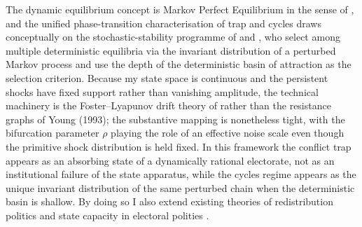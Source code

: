 \documentclass[11pt,twoside]{extarticle}
\begin{document}
The dynamic equilibrium concept is Markov Perfect Equilibrium in the sense of \citet{maskinMarkovPerfectEquilibrium2001}, and the unified phase-transition characterisation of trap and cycles draws conceptually on the stochastic-stability programme of \citet{youngEvolutionConventions1993,youngIndividualStrategySocial2020} and \citet{kandoriLearningMutationLong1993a}, who select among multiple deterministic equilibria via the invariant distribution of a perturbed Markov process and use the depth of the deterministic basin of attraction as the selection criterion. Because my state space is continuous and the persistent shocks have fixed support rather than vanishing amplitude, the technical machinery is the Foster--Lyapunov drift theory of \citet{meynMarkovChainsStochastic2012} rather than the resistance graphs of Young (1993); the substantive mapping is nonetheless tight, with the bifurcation parameter $\rho$ playing the role of an effective noise scale even though the primitive shock distribution is held fixed. In this framework the conflict trap appears as an absorbing state of a dynamically rational electorate, not as an institutional failure of the state apparatus, while the cycles regime appears as the unique invariant distribution of the same perturbed chain when the deterministic basin is shallow. By doing so I also extend existing theories of redistribution politics and state capacity in electoral polities \citep*{alesinaPoliticsBusinessCycles1989,besleyOriginsStateCapacity2009,besleyStateCapacityConflict2010}.






\end{document}

